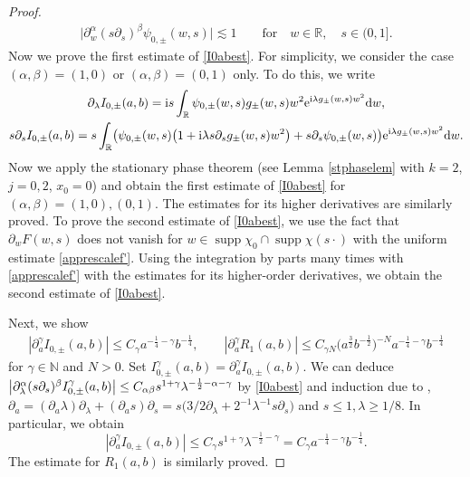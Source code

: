 \documentclass[pdftex]{sigma}
\numberwithin{equation}{section}
\def\R{\mathbb{R}}%
\DeclareMathOperator{\supp}{supp}%
\def\a{\alpha}
\def\b{\beta}
\def\c{\gamma}
\def\g{\psi}
\def\l{\lambda}
\def\pa{\partial}
\begin{document}
\begin{proof}
\begin{align*}
\big|\pa_w^{\a}(s\pa_s)^{\b}\g_{0,\pm}(w,s)\big|\lesssim 1\qquad \text{for}\quad w\in\R,\quad s\in (0,1].
\end{align*}
Now we prove the first estimate of \eqref{I0abest}. For simplicity, we consider the case $(\a,\b)=(1,0)$ or $(\a,\b)=(0,1)$ only. To do this, we write
\begin{gather*}
\pa_{\l}I_{0,\pm}(a,b)={\rm i}s\int_{\R}\g_{0,\pm}(w,s)g_{\pm}(w,s)w^2{\rm e}^{{\rm i}\l g_{\pm}(w,s)w^2}{\rm d}w,\\
s\pa_{s}I_{0,\pm}(a,b)=s\int_{\R}\bigl(\g_{0,\pm}(w,s)\bigl(1+{\rm i}\l s\pa_sg_{\pm}(w,s) w^2\bigr) +s\pa_s\g_{0,\pm}(w,s) \bigr) {\rm e}^{{\rm i}\l g_{\pm}(w,s)w^2}{\rm d}w.
\end{gather*}
Now we apply the stationary phase theorem (see Lemma \ref{stphaselem} with $k=2$, $j=0,2$, $x_0=0$) and obtain the first estimate of \eqref{I0abest} for $(\a,\b)=(1,0), (0,1)$. The estimates for its higher derivatives are similarly proved. To prove the second estimate of \eqref{I0abest}, we use the fact that~${\pa_wF(w,s)}$ does not vanish for $w\in \supp \chi_0\cap \supp \chi(s\cdot )$ with the uniform estimate \eqref{apprescalef'}.
 Using the integration by parts many times with \eqref{apprescalef'} with the estimates for its higher-order derivatives, we obtain the second estimate of \eqref{I0abest}.

Next, we show
\begin{align}\label{appI_0ader}
|\pa_{a}^{\c}I_{0,\pm}(a,b)|\leq C_{\c}a^{-\frac{1}{4}-\c}b^{-\frac{1}{4}},\qquad |\pa_{a}^{\c}R_1(a,b)|\leq C_{\c N}\bigl(a^{\frac{3}{2}}b^{-\frac{1}{2}}\bigr)^{-N} a^{-\frac{1}{4}-\c}b^{-\frac{1}{4}}
\end{align}
for $\c\in\mathbb{N}$ and $N>0$.
Set $I_{0,\pm}^{\c}(a,b)=\pa_a^{\c}I_{0,\pm}(a,b)$. We can deduce $\big|\pa_{\l}^{\a}(s\pa_{s})^{\b}I_{0,\pm}^{\c}(a,b)\big|\leq \smash{C_{\a\b}s^{1+\c}\l^{-\frac{1}{2}-\a-\c}}$ by \eqref{I0abest} and induction due to \smash{$I_{0,\pm}^{\c+1}=\pa_aI_{0,\pm}^{\c}$}, $\pa_a= (\pa_a\l)\pa_{\l}+(\pa_as)\pa_s= s\bigl(3/2\pa_{\l}+2^{-1}\l^{-1}s \pa_s\bigr)$ and $s\leq 1, \l\geq 1/8$. In particular, we obtain
\[
|\pa_a^{\c}I_{0,\pm}(a,b)|\leq C_{\c}s^{1+\c}\l^{-\frac{1}{2}-\c}=C_{\c}a^{-\frac{1}{4}-\c}b^{-\frac{1}{4}}.
\]
 The estimate for $R_1(a,b)$ is similarly proved.


\end{proof}
\end{document}
